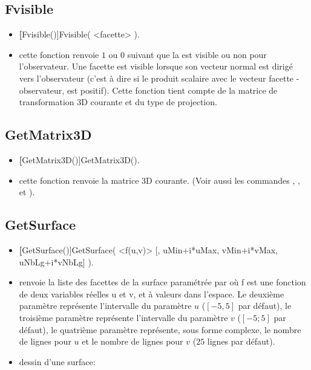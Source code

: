 \subsection{Fvisible}\label{cmdFvisible}

\begin{itemize}
 \item \util \textbf[Fvisible()]{Fvisible( <facette> )}.
 \item \desc cette fonction renvoie $1$ ou $0$ suivant que la  est visible ou non pour l'observateur. Une facette est visible lorsque son vecteur normal est dirigé vers l'observateur (c'est à dire si le produit scalaire avec le vecteur facette - observateur, est positif). Cette fonction tient compte de la matrice de transformation 3D courante et du type de projection.
\end{itemize}


\subsection{GetMatrix3D}\label{cmdGetMatrix3D}

\begin{itemize}
 \item \util \textbf[GetMatrix3D()]{GetMatrix3D()}.
 \item \desc cette fonction renvoie la matrice 3D courante. (Voir aussi les commandes , , et ).
\end{itemize}


\subsection{GetSurface}\label{cmdGetSurface}

\begin{itemize}
 \item \util \textbf[GetSurface()]{GetSurface( <f(u,v)> [, uMin+i*uMax, vMin+i*vMax, uNbLg+i*vNbLg] )}.
 \item \desc renvoie la liste des facettes de la surface paramétrée par  où f est une fonction de deux variables réelles u et v, et à valeurs dans l'espace. Le deuxième paramètre représente l'intervalle du paramètre $u$ ($[-5,5]$ par défaut), le troisième paramètre représente l'intervalle du paramètre $v$ ($[-5;5]$ par défaut), le quatrième paramètre représente, sous forme complexe, le nombre de lignes pour $u$ et le nombre de lignes pour $v$ ($25$ lignes par défaut).
 \item \exem dessin d'une surface:
\end{itemize}

